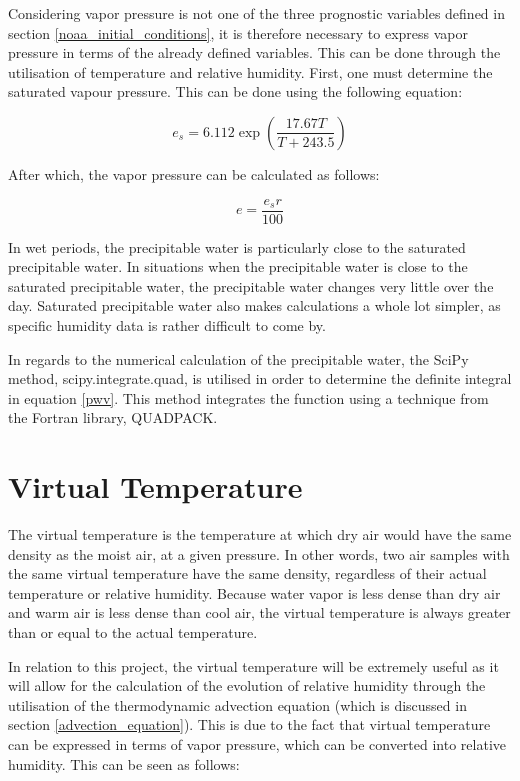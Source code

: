 Considering vapor pressure is not one of the three prognostic variables defined in section \ref{noaa_initial_conditions}, it is therefore necessary to express vapor pressure in terms of the already defined variables. This can be done through the utilisation of temperature and relative humidity. First, one must determine the saturated vapour pressure. This can be done using the following equation\cite{balton}:

\begin{equation}
    e_s = 6.112 \exp(\frac{17.67 T}{T + 243.5})
\end{equation}

After which, the vapor pressure can be calculated as follows:

\begin{equation}
    e = \frac{e_{s} r}{100}
    \label{vapor_pressure_eq}
\end{equation}

In wet periods, the precipitable water is particularly close to the saturated precipitable water. In situations when the precipitable water is close to the saturated precipitable water, the precipitable water changes very little over the day. Saturated precipitable water also makes calculations a whole lot simpler, as specific humidity data is rather difficult to come by.

In regards to the numerical calculation of the precipitable water, the SciPy method, scipy.integrate.quad, is utilised in order to determine the definite integral in equation \ref{pwv}. This method integrates the function using a technique from the Fortran library, QUADPACK\cite{scipy_integrate}. 

\section{Virtual Temperature}\label{virtual_section}
The virtual temperature is the temperature at which dry air would have the same density as the moist air, at a given pressure. In other words, two air samples with the same virtual temperature have the same density, regardless of their actual temperature or relative humidity. Because water vapor is less dense than dry air and warm air is less dense than cool air, the virtual temperature is always greater than or equal to the actual temperature. 

In relation to this project, the virtual temperature will be extremely useful as it will allow for the calculation of the evolution of relative humidity through the utilisation of the thermodynamic advection equation (which is discussed in section \ref{advection_equation}). This is due to the fact that virtual temperature can be expressed in terms of vapor pressure, which can be converted into relative humidity.  This can be seen as follows:

